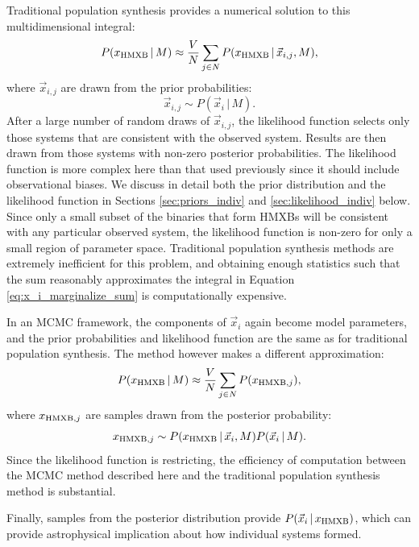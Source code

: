 \documentclass[12pt, preprint]{aastex}
\newcommand{\given}{\,|\,}
\begin{document}
Traditional population synthesis provides a numerical solution to this multidimensional integral:
\begin{equation}
P(x_{\rm HMXB} \given M) \approx \frac{V}{N} \sum_{j \in N} P( x_{\rm HMXB} \given \vec{x}_{i,j}, M ), \label{eq:x_i_marginalize_sum}
\end{equation}
where $\vec{x}_{i,j}$ are drawn from the prior probabilities:
\begin{equation}
\vec{x}_{i,j} \sim P(\vec{x}_i \given M).
\end{equation}
After a large number of random draws of $\vec{x}_{i,j}$, the likelihood function selects only those systems that are consistent with the observed system. Results are then drawn from those systems with non-zero posterior probabilities. The likelihood function is more complex here than that used previously since it should include observational biases. We discuss in detail both the prior distribution and the likelihood function in Sections \ref{sec:priors_indiv} and \ref{sec:likelihood_indiv} below. Since only a small subset of the binaries that form HMXBs will be consistent with any particular observed system, the likelihood function is non-zero for only a small region of parameter space. Traditional population synthesis methods are extremely inefficient for this problem, and obtaining enough statistics such that the sum reasonably approximates the integral in Equation \ref{eq:x_i_marginalize_sum} is computationally expensive.


In an MCMC framework, the components of $\vec{x}_i$ again become model parameters, and the prior probabilities and likelihood function are the same as for traditional population synthesis. The method however makes a different approximation:
\begin{equation}
P(x_{\rm HMXB} \given M) \approx \frac{V}{N} \sum_{j \in N} P( x_{{\rm HMXB},j}),
\end{equation}
where $x_{{\rm HMXB},j}$ are samples drawn from the posterior probability:
\begin{equation}
x_{{\rm HMXB},j} \sim P( x_{\rm HMXB} \given \vec{x}_i, M ) P(\vec{x}_i \given M).
\end{equation}
Since the likelihood function is restricting, the efficiency of computation between the MCMC method described here and the traditional population synthesis method is substantial. 


Finally, samples from the posterior distribution provide $P(\vec{x}_i \given x_{\rm HMXB})$, which can provide astrophysical implication about how individual systems formed.
\end{document}
